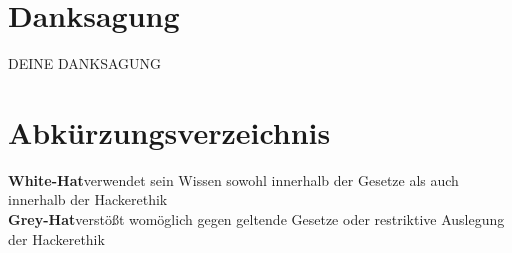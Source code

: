 \documentclass[FinalThesis]{Deckblatt}
\author{\name}
\title{\titelDerArbeit}
\subtitle{\subTitelDerAbeit}
\date{\@myDate}
\begin{document}
\maketitle
{}
\pagestyle{plain}
\renewcommand*{\abstractname}{\Large Abstract}

\begin{abstract}
DEIN ABSTRACT
\end{abstract}

\chapter*{Danksagung}
DEINE DANKSAGUNG

\tableofcontents


\printbibliography
\listoffigures
\listoftables
{\let\cleardoublepage\relax \chapter*{Abkürzungsverzeichnis}}
\textbf{White-Hat}\dotfill verwendet sein Wissen sowohl innerhalb der Gesetze als auch innerhalb der Hackerethik\\
\textbf{Grey-Hat}\dotfill verstößt womöglich gegen geltende Gesetze oder restriktive Auslegung der Hackerethik\\
\appendix


\printAuthor
\end{document}
